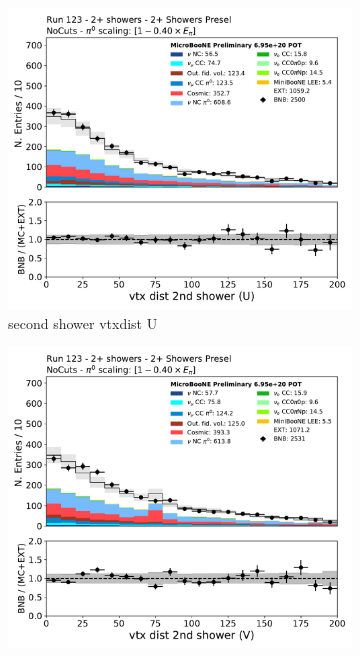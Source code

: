 \begin{figure}[H]
    \centering
    \begin{subfigure}{0.3\textwidth}
    \includegraphics[width=1.0\textwidth]{Sidebands/Figures/TwoShr_1e0pSel/Presel/secondshower_U_vtxdist.pdf}
    \caption{second shower vtxdist U}
    \end{subfigure}
    \begin{subfigure}{0.3\textwidth}
    \includegraphics[width=1.0\textwidth]{Sidebands/Figures/TwoShr_1e0pSel/Presel/secondshower_V_vtxdist.pdf}

\end{subfigure}
\end{figure}
